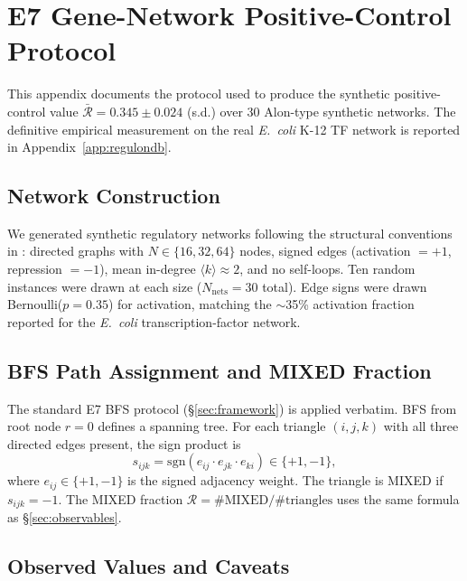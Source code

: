 \documentclass[12pt,a4paper]{article}
\newcommand{\R}{\mathcal{R}}           %
\theoremstyle{plain}
\theoremstyle{definition}
\theoremstyle{remark}
\begin{document}
\section{E7 Gene-Network Positive-Control Protocol}
\label{app:geneprotocol}

This appendix documents the protocol used to produce the synthetic positive-control value
$\bar{\R}=0.345\pm0.024$ (s.d.) over 30 Alon-type synthetic networks.
The definitive empirical measurement on the real \textit{E.~coli} K-12
TF network is reported in Appendix~\ref{app:regulondb}.

\subsection*{Network Construction}

We generated synthetic regulatory networks following the structural conventions
in \citet{Alon2007}: directed graphs with $N\in\{16,32,64\}$ nodes, signed edges
(activation $=+1$, repression $=-1$), mean in-degree $\langle k\rangle\approx2$,
and no self-loops.  Ten random instances were drawn at each size ($N_\text{nets}=30$
total).  Edge signs were drawn Bernoulli($p=0.35$) for activation, matching the
$\sim$35\% activation fraction reported for the \textit{E.~coli}
transcription-factor network.

\subsection*{BFS Path Assignment and MIXED Fraction}

The standard E7 BFS protocol (§\ref{sec:framework}) is applied verbatim.
BFS from root node $r=0$ defines a spanning tree.  For each triangle
$(i,j,k)$ with all three directed edges present, the sign product is
\begin{equation}
  s_{ijk} = \mathrm{sgn}(e_{ij}\cdot e_{jk}\cdot e_{ki})\in\{+1,-1\},
\end{equation}
where $e_{ij}\in\{+1,-1\}$ is the signed adjacency weight.  The triangle is MIXED
if $s_{ijk}=-1$.  The MIXED fraction
$\R = \#\text{MIXED}/\#\text{triangles}$ uses the same formula as §\ref{sec:observables}.

\subsection*{Observed Values and Caveats}
\end{document}
